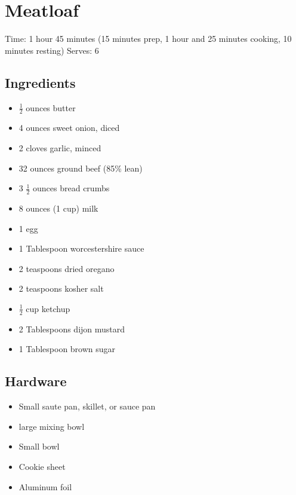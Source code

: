 \section{Meatloaf}
\label{Meatloaf}
\setcounter{secnumdepth}{0}
Time: 1 hour 45 minutes (15 minutes prep, 1 hour and 25 minutes cooking, 10 minutes resting)
Serves: 6

\begin{multicols}{2}
\subsection*{Ingredients}
\begin{itemize}
    \item \( \frac{1}{2} \) ounces butter
    \item 4 ounces sweet onion, diced
    \item 2 cloves garlic, minced
    \item 32 ounces ground beef (85\% lean)
    \item 3 \( \frac{1}{2} \) ounces bread crumbs
    \item 8 ounces (1 cup) milk
    \item 1 egg
    \item 1 Tablespoon worcestershire sauce
    \item 2 teaspoons dried oregano
    \item 2 teaspoons kosher salt
    \item \( \frac{1}{2} \) cup ketchup
    \item 2 Tablespoons dijon mustard
    \item 1 Tablespoon brown sugar
\end{itemize}

\subsection*{Hardware}
\begin{itemize}
    \item Small saute pan, skillet, or sauce pan
    \item large mixing bowl
    \item Small bowl
    \item Cookie sheet
    \item Aluminum foil
\end{itemize}
\clearpage


\end{multicols}

